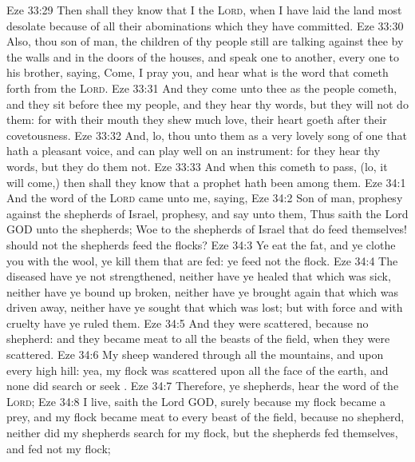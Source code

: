 \vs Eze 33:29 Then shall they know that I  the \textsc{Lord}, when I have laid the land most desolate because of all their abominations which they have committed.
\vs Eze 33:30 Also, thou son of man, the children of thy people still are talking against thee by the walls and in the doors of the houses, and speak one to another, every one to his brother, saying, Come, I pray you, and hear what is the word that cometh forth from the \textsc{Lord}.
\vs Eze 33:31 And they come unto thee as the people cometh, and they sit before thee  my people, and they hear thy words, but they will not do them: for with their mouth they shew much love,  their heart goeth after their covetousness.
\vs Eze 33:32 And, lo, thou  unto them as a very lovely song of one that hath a pleasant voice, and can play well on an instrument: for they hear thy words, but they do them not.
\vs Eze 33:33 And when this cometh to pass, (lo, it will come,) then shall they know that a prophet hath been among them.
\vs Eze 34:1 And the word of the \textsc{Lord} came unto me, saying,
\vs Eze 34:2 Son of man, prophesy against the shepherds of Israel, prophesy, and say unto them, Thus saith the Lord GOD unto the shepherds; Woe  to the shepherds of Israel that do feed themselves! should not the shepherds feed the flocks?
\vs Eze 34:3 Ye eat the fat, and ye clothe you with the wool, ye kill them that are fed:  ye feed not the flock.
\vs Eze 34:4 The diseased have ye not strengthened, neither have ye healed that which was sick, neither have ye bound up  broken, neither have ye brought again that which was driven away, neither have ye sought that which was lost; but with force and with cruelty have ye ruled them.
\vs Eze 34:5 And they were scattered, because  no shepherd: and they became meat to all the beasts of the field, when they were scattered.
\vs Eze 34:6 My sheep wandered through all the mountains, and upon every high hill: yea, my flock was scattered upon all the face of the earth, and none did search or seek .
\vs Eze 34:7 Therefore, ye shepherds, hear the word of the \textsc{Lord};
\vs Eze 34:8  I live, saith the Lord GOD, surely because my flock became a prey, and my flock became meat to every beast of the field, because  no shepherd, neither did my shepherds search for my flock, but the shepherds fed themselves, and fed not my flock;

